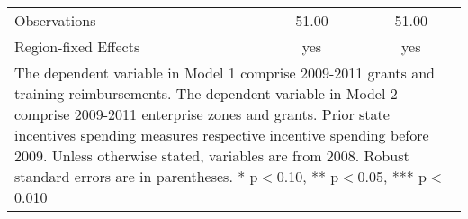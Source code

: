 \begin{table}[!htbp]
\begin{tabular}{l*{2}{c}}
\hline
Observations        &       51.00   &       51.00   \\
Region-fixed Effects&         yes   &         yes   \\
\hline\hline
\multicolumn{3}{p{0.75\linewidth}}{\footnotesize The dependent variable in Model 1 comprise 2009-2011 grants and training reimbursements. The dependent variable in Model 2 comprise 2009-2011 enterprise zones and grants. Prior state incentives spending measures respective incentive spending before 2009. Unless otherwise stated, variables are from 2008. Robust standard errors are in parentheses. * p$<$0.10, ** p$<$0.05, *** p$<$0.010}\\
\end{tabular}
\end{table}
